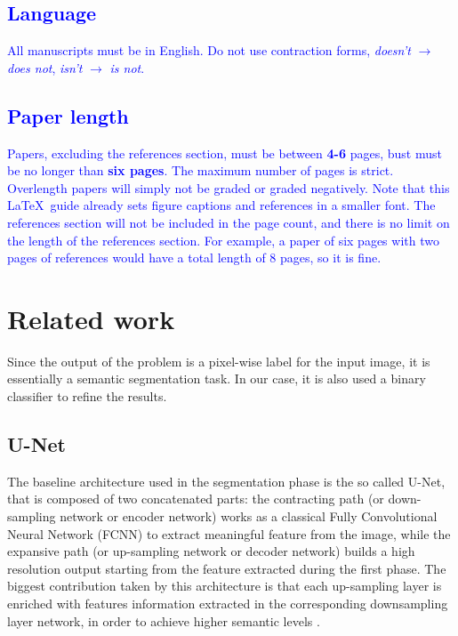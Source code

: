 \documentclass[10pt,twocolumn,letterpaper]{article}
\begin{document}
   \textcolor{blue}{
   \subsection{Language}
      All manuscripts must be in English. Do not use contraction forms, \eg \emph{doesn't} $\xrightarrow{}$ \emph{does not}, \emph{isn't} $\xrightarrow{}$ \emph{is not}. }

   \textcolor{blue}{
   \subsection{Paper length}
      Papers, excluding the references section, must be between \textbf{4-6} pages, bust must be no longer than \textbf{six pages}. The maximum number of pages is strict. Overlength papers will simply not be graded or graded negatively. Note that this \LaTeX\ guide already sets figure captions and references in a smaller font.
      The references section will not be included in the page count, and there is no limit on the length of the references section. For example, a paper of six pages with two pages of references would have a total length of 8 pages, so it is fine.}



\section{Related work}
   Since the output of the problem is a pixel-wise label for the input image, it is essentially a semantic segmentation task. In our case, it is also used a binary classifier to refine the results.
   \subsection{U-Net}
      The baseline architecture used in the segmentation phase is the so called U-Net, that is composed of two concatenated parts: the contracting path (or down-sampling network or encoder network) works as a classical Fully Convolutional Neural Network (FCNN) to extract meaningful feature from the image, while the expansive path (or up-sampling network or decoder network) builds a high resolution output starting from the feature extracted during the first phase. The biggest contribution taken by this architecture is that each up-sampling layer is enriched with features information extracted in the corresponding downsampling layer network, in order to achieve higher semantic levels \cite{Unet}. 
\end{document}
